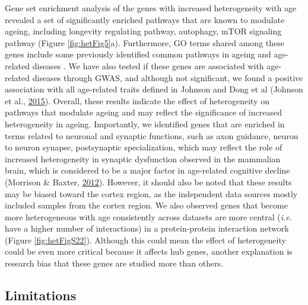 \documentclass[12pt,twoside]{unicam}
\begin{document}
Gene set enrichment analysis of the genes with increased heterogeneity with age revealed a set of significantly enriched pathways that are known to modulate ageing, including longevity regulating pathway, autophagy, mTOR signaling pathway (Figure \ref{fig:hetFig5}a). Furthermore, GO terms shared among these genes include some previously identified common pathways in ageing and age-related diseases
. We have also tested if these genes are associated with age-related diseases through GWAS, and although not significant, we found a positive association with all age-related traits defined in Johnson and Dong et al (Johnson et al., \protect\hyperlink{ref-Johnson2015}{2015}). Overall, these results indicate the effect of heterogeneity on pathways that modulate ageing and may reflect the significance of increased heterogeneity in ageing. Importantly, we identified genes that are enriched in terms related to neuronal and synaptic functions, such as axon guidance, neuron to neuron synapse, postsynaptic specialization, which may reflect the role of increased heterogeneity in synaptic dysfunction observed in the mammalian brain, which is considered to be a major factor in age-related cognitive decline (Morrison \& Baxter, \protect\hyperlink{ref-Morrison2012}{2012}). However, it should also be noted that these results may be biased toward the cortex region, as the independent data sources mostly included samples from the cortex region. We also observed genes that become more heterogeneous with age consistently across datasets are more central (\emph{i.e.} have a higher number of interactions) in a protein-protein interaction network (Figure \ref{fig:hetFigS22}). Although this could mean the effect of heterogeneity could be even more critical because it affects hub genes, another explanation is research bias that these genes are studied more than others.

\hypertarget{limitations}{%
\subsection{Limitations}\label{limitations}}
\end{document}
